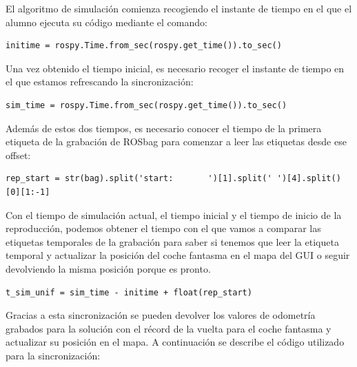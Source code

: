 El algoritmo de simulación comienza recogiendo el instante de tiempo en el que el alumno ejecuta su código mediante el comando:

\lstset{language=Python, breaklines=true, basicstyle=\footnotesize}
\begin{lstlisting}[frame=single]
initime = rospy.Time.from_sec(rospy.get_time()).to_sec()
\end{lstlisting}

Una vez obtenido el tiempo inicial, es necesario recoger el instante de tiempo en el que estamos refrescando la sincronización:

\lstset{language=Python, breaklines=true, basicstyle=\footnotesize}
\begin{lstlisting}[frame=single]
sim_time = rospy.Time.from_sec(rospy.get_time()).to_sec()
\end{lstlisting}

Además de estos dos tiempos, es necesario conocer el tiempo de la primera etiqueta de la grabación de ROSbag para comenzar a leer las etiquetas desde ese offset:
\lstset{language=Python, breaklines=true, basicstyle=\footnotesize}
\begin{lstlisting}[frame=single]
rep_start = str(bag).split('start:       ')[1].split(' ')[4].split()[0][1:-1]
\end{lstlisting}
Con el tiempo de simulación actual, el tiempo inicial y el tiempo de inicio de la reproducción, podemos obtener el tiempo con el que vamos a comparar las etiquetas temporales de la grabación para saber si tenemos que leer la etiqueta temporal y actualizar la posición del coche fantasma en el mapa del GUI o seguir devolviendo la misma posición porque es pronto.

\lstset{language=Python, breaklines=true, basicstyle=\footnotesize}
\begin{lstlisting}[frame=single]
t_sim_unif = sim_time - initime + float(rep_start)
\end{lstlisting}

Gracias a esta sincronización se pueden devolver los valores de odometría grabados para la solución con el récord de la vuelta para el coche fantasma y actualizar su posición en el mapa. A continuación se describe el código utilizado para la sincronización:

